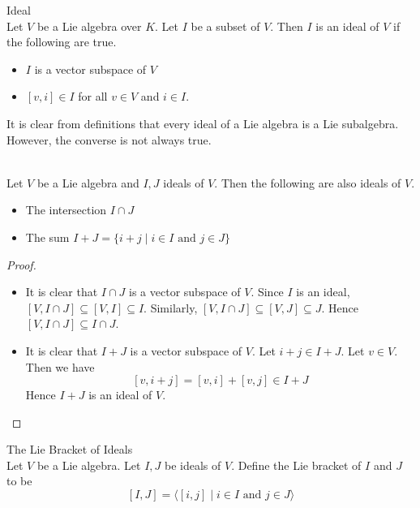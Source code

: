 \documentclass[a4paper]{article}
\begin{document}
\begin{defn}{Ideal}{} \\Let $V$ be a Lie algebra over $K$. Let $I$ be a subset of $V$. Then $I$ is an ideal of $V$ if the following are true. 
\begin{itemize}
\item $I$ is a vector subspace of $V$
\item $[v,i]\in I$ for all $v\in V$ and $i\in I$. 
\end{itemize}
\end{defn}

It is clear from definitions that every ideal of a Lie algebra is a Lie subalgebra. However, the converse is not always true. 

\begin{prp}{}{} \\Let $V$ be a Lie algebra and $I,J$ ideals of $V$. Then the following are also ideals of $V$. 
\begin{itemize}
\item The intersection $I\cap J$
\item The sum $I+J=\{i+j\;|\;i\in I\text{ and }j\in J\}$
\end{itemize} 
\begin{proof}~\\
\begin{itemize}
\item It is clear that $I\cap J$ is a vector subspace of $V$. Since $I$ is an ideal, $[V,I\cap J]\subseteq [V,I]\subseteq I$. Similarly, $[V,I\cap J]\subseteq[V,J]\subseteq J$. Hence $[V,I\cap J]\subseteq I\cap J$. 
\item It is clear that $I+J$ is a vector subspace of $V$. Let $i+j\in I+J$. Let $v\in V$. Then we have $$[v,i+j]=[v,i]+[v,j]\in I+J$$ Hence $I+J$ is an ideal of $V$. 
\end{itemize}
\end{proof}
\end{prp}

\begin{defn}{The Lie Bracket of Ideals}{} \\Let $V$ be a Lie algebra. Let $I,J$ be ideals of $V$. Define the Lie bracket of $I$ and $J$ to be $$[I,J]=\langle[i,j]\;|\;i\in I\text{ and }j\in J\rangle$$
\end{defn}
\end{document}
